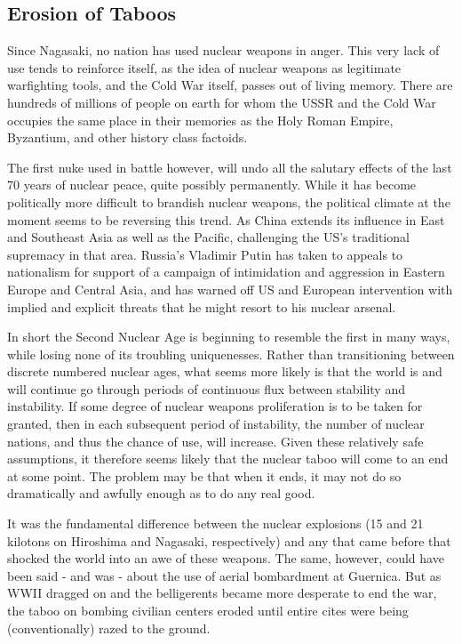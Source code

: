 \documentclass[journal]{IEEEtran}
\begin{document}
\subsection{Erosion of Taboos}
Since Nagasaki, no nation has used nuclear weapons in anger.  This very lack of use tends to reinforce itself, as the idea of nuclear weapons as legitimate warfighting tools, and the Cold War itself, passes out of living memory.  There are hundreds of millions of people on earth for whom the USSR and the Cold War occupies the same place in their memories as the Holy Roman Empire, Byzantium, and other history class factoids.\par
The first nuke used in battle however, will undo all the salutary effects of the last 70 years of nuclear peace, quite possibly permanently.  While it has become politically more difficult to brandish nuclear weapons, the political climate at the moment seems to be reversing this trend.  As China extends its influence in East and Southeast Asia as well as the Pacific, challenging the US's traditional supremacy in that area.  Russia's Vladimir Putin has taken to appeals to nationalism for support of a campaign of intimidation and aggression in Eastern Europe and Central Asia, and has warned off US and European intervention with implied and explicit threats that he might resort to his nuclear arsenal.\par
In short the Second Nuclear Age is beginning to resemble the first in many ways, while losing none of its troubling uniquenesses.  Rather than transitioning between discrete numbered nuclear ages, what seems more likely is that the world is and will continue go through periods of continuous flux between stability and instability.  If some degree of nuclear weapons proliferation is to be taken for granted, then in each subsequent period of instability, the number of nuclear nations, and thus the chance of use, will increase.  Given these relatively safe assumptions, it therefore seems likely that the nuclear taboo will come to an end at some point.  The problem may be that when it ends, it may not do so dramatically and awfully enough as to do any real good.\par
It was the fundamental difference between the nuclear explosions (15 and 21 kilotons on Hiroshima and Nagasaki, respectively) and any that came before that shocked the world into an awe of these weapons.  The same, however, could have been said - and was - about the use of aerial bombardment at Guernica.  But as WWII dragged on and the belligerents became more desperate to end the war, the taboo on bombing civilian centers eroded until entire cites were being (conventionally) razed to the ground.\par
\end{document}
